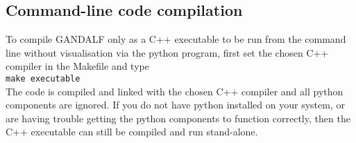 \documentclass[a4paper]{article}
\newcommand{\var}[1]{\texttt{#1}}
\begin{document}
\subsection{Command-line code compilation}

To compile GANDALF only as a C++ executable to be run from the command line without visualisation via the python program, first set the chosen C++ compiler in the Makefile and type \\
\newline
\noindent \var{make executable} \\

\noindent The code is compiled and linked with the chosen C++ compiler and all python components are ignored.  If you do not have python installed on your system, or are having trouble getting the python components to function correctly, then the C++ executable can still be compiled and run stand-alone.


\end{document}
